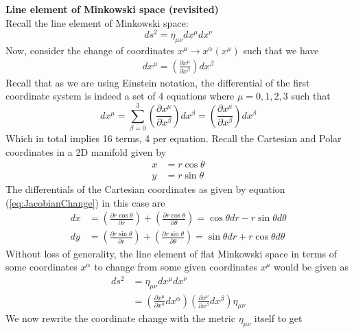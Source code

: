 \documentclass{article}
\begin{document}
 		\begin{exmp}
 			\textbf{Line element of Minkowski space (revisited)}\\
 			Recall the line element of Minkowski space:
 			$$ ds^2 = \eta_{\mu\nu} dx^\mu dx^\nu$$
 			Now, consider the change of coordinates $x^\mu \to x^\alpha (x^\mu)$ such that we have
 			\begin{align*}
 				dx^\mu = \left(\frac{\partial x^\mu}{\partial x^\beta} \right) dx^{\beta}
 			\end{align*} 
 			Recall that as we are using Einstein notation, the differential of the first coordinate system is indeed a set of 4 equations where $\mu=0,1,2,3$ such that
 			\begin{equation}
 				\label{eq:JacobianChange}
 				\boxed{dx^\mu = \sum_{\beta = 0 }^3 \left(\frac{\partial x^\mu}{\partial x^\beta} \right) dx^\beta =  \left(\frac{\partial x^\mu}{\partial x^\beta} \right) dx^{\beta}}
 			\end{equation}
 			Which in total implies 16 terms, 4 per equation.
 			Recall the Cartesian and Polar coordinates in a 2D manifold given by
 			\begin{align*}
 				x &= r \cos \theta  \\
 				y &= r \sin \theta
 			\end{align*}
 			The differentials of the Cartesian coordinates as given by equation (\ref{eq:JacobianChange}) in this case are
 			\begin{align*}
 				dx &= \left(\frac{\partial r\cos \theta}{\partial r} \right)  + \left(\frac{\partial r\cos \theta}{\partial \theta} \right)= \cos \theta dr - r\sin\theta d\theta \\
 				dy &= \left(\frac{\partial r\sin \theta}{\partial r} \right) + \left(\frac{\partial r\sin \theta}{\partial \theta} \right) = \sin \theta dr + r\cos\theta d \theta
 			\end{align*}
 			Without loss of generality, the line element of flat Minkowski space in terms of some coordinates $x^\alpha$ to change from some given coordinates $x^\mu$ would be given as
 			\begin{align*}
 				ds^2 &= \eta_{\mu\nu} dx^\mu dx^\nu \\
 				& = \left( \frac{\partial x^\mu}{\partial x^\alpha} dx^\alpha \right) \left( \frac{\partial x^\nu}{\partial x^\beta} dx^\beta \right) \eta_{\mu\nu}
 			\end{align*}
 			We now rewrite the coordinate change with the metric $\eta_{\mu\nu}$ itself to get
 			\begin{equation}

\end{equation}
\end{exmp}
\end{document}
